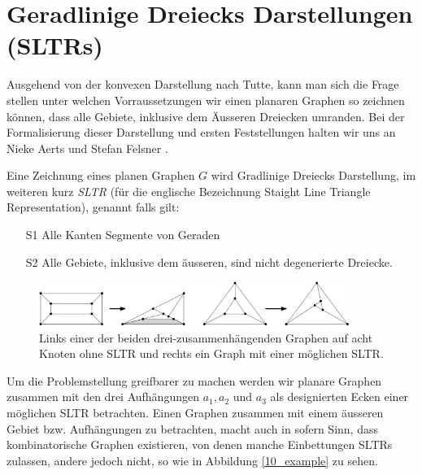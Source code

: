 \section{Geradlinige Dreiecks Darstellungen (SLTRs)}

Ausgehend von der konvexen Darstellung nach Tutte, kann man sich die Frage stellen unter welchen Vorraussetzungen wir einen planaren Graphen so zeichnen können, dass alle Gebiete, inklusive dem Äusseren Dreiecken umranden. Bei der Formalisierung dieser Darstellung und ersten Feststellungen halten wir uns an Nieke Aerts und Stefan Felsner \cite{af13}.

\begin{definition}[SLTR]\label{defsltr}
Eine Zeichnung eines planen Graphen $G$ wird Gradlinige Dreiecks Darstellung, im weiteren kurz \textit{SLTR} (für die englische Bezeichnung Staight Line Triangle Representation), genannt falls gilt:
\begin{itemize}
\item[S1] Alle Kanten Segmente von Geraden
\item[S2] Alle Gebiete, inklusive dem äusseren, sind nicht degenerierte Dreiecke.
\end{itemize}
\end{definition}

\begin{figure}[h]
	\centering
  \includegraphics[width=0.9\textwidth]{sltr-example.png}
	\caption{Links einer der beiden drei-zusammenhängenden Graphen auf acht Knoten ohne SLTR und rechts ein Graph mit einer möglichen SLTR.}
\end{figure}

Um die Problemstellung greifbarer zu machen werden wir planare Graphen zusammen mit den drei Aufhängungen $a_1,a_2$ und $a_3$ als designierten Ecken einer möglichen SLTR betrachten. Einen Graphen zusammen mit einem äusseren Gebiet bzw. Aufhängungen zu betrachten, macht auch in sofern Sinn, dass kombinatorische Graphen existieren, von denen manche Einbettungen SLTRs zulassen, andere jedoch nicht, so wie in Abbildung \ref{10_example} zu sehen.

